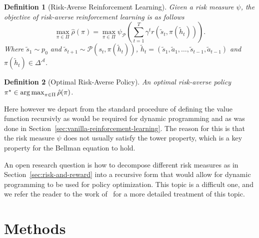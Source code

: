 \documentclass[10pt]{article}
\newtheorem{definition}{Definition}
\renewcommand{\cite}{\citep}
\theoremstyle{plain}
\theoremstyle{remark}
\begin{document}
\begin{definition}[Risk-Averse Reinforcement Learning]\label{def:risk_averse_rl}
        Given a risk measure $\psi$, the objective of risk-averse reinforcement learning is as follows
        \[
                \max_{\pi \in \Pi} \hat{\rho}(\pi) = \max_{\pi \in \Pi} \psi_\mathcal{P} \left( \sum_{t=1}^{T} \gamma^t r(\tilde{s}_t, \pi(\tilde{h}_t)) \right).
        \]
        Where $\tilde{s}_1 \sim p_0$ and $\tilde{s}_{t+1} \sim \mathcal{P}(s_t, \pi(\tilde{h}_t))$, $\tilde{h}_t = (\tilde{s}_1, \tilde{a}_1, \ldots, \tilde{s}_{t-1}, \tilde{a}_{t-1})$ and $\pi(\tilde{h}_t) \in \Delta^\mathcal{A}$.
\end{definition}

\begin{definition}[Optimal Risk-Averse Policy]\label{def:optimal_risk_averse_policy}
        An optimal risk-averse policy $\pi^\star \in \operatorname*{arg\,max}_{\pi \in \Pi} \hat{\rho}(\pi)$.
\end{definition}

Here however we depart from the standard procedure of defining the value function recursivly as would be required for dynamic programming and as was done in Section~\ref{sec:vanilla-reinforcement-learning}.
The reason for this is that the risk measure $\psi$ does not usually satisfy the tower property, which is a key property for the Bellman equation to hold.

An open research question is how to decompose different risk measures as in Section~\ref{sec:risk-and-reward} into a recursive form that would allow for dynamic programming to be used for policy optimization.
This topic is a difficult one, and we refer the reader to the work of~\cite{Hau2023OnDP, Bauerle2011, follmer2016} for a more detailed treatment of this topic.


\section{Methods}


\end{document}
